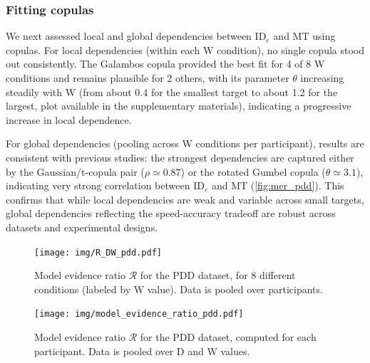 \documentclass[acmlarge, manuscript,review]{acmart}
\newcommand{\ide}{\ensuremath{{\text{ID}_e}}\xspace}
\begin{document}
\subsubsection{Fitting copulas}
We next assessed local and global dependencies between \ide and MT using copulas. For local dependencies (within each W condition), no single copula stood out consistently. The Galambos copula provided the best fit for 4 of 8 W conditions and remains plausible for 2 others, with its parameter $\theta$ increasing steadily with W (from about 0.4 for the smallest target to about 1.2 for the largest, plot available in the supplementary materials), indicating a progressive increase in local dependence.

For global dependencies (pooling across W conditions per participant), results are consistent with previous studies: the strongest dependencies are captured either by the Gaussian/t-copula pair ($\rho \simeq 0.87$) or the rotated Gumbel copula ($\theta \simeq 3.1$), indicating very strong correlation between 
\ide and MT (\autoref{fig:mer_pdd}). This confirms that while local dependencies are weak and variable across small targets, global dependencies reflecting the speed-accuracy tradeoff are robust across datasets and experimental designs.


\begin{figure}[htbp]
	\centering
	\texttt{[image: img/R\_DW\_pdd.pdf]}
	\caption{Model evidence ratio $\mathcal{R}$ for the PDD dataset, for 8 different conditions (labeled by W value). Data is pooled over participants.}
	\label{fig:R_DW_pdd}
\end{figure}
\begin{figure}[htbp]
	\centering
	\texttt{[image: img/model\_evidence\_ratio\_pdd.pdf]}
	\caption{Model evidence ratio $\mathcal{R}$ for the PDD dataset, computed for each participant. Data is pooled over D and W values.}
	\label{fig:mer_pdd}
\end{figure}

\end{document}
